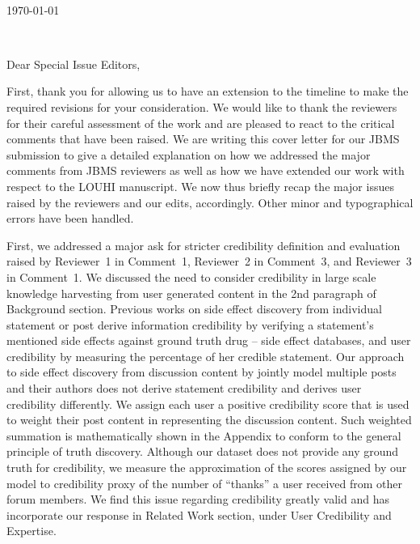 \documentclass[11pt,a4paper]{letter} %
\def\opening#1{\thispagestyle{empty}
{\centering\fromaddress \vspace{0.6in} \\ %
\hspace*{\longindentation}\today\hspace*{\fill}\par} %
{\raggedright \toname \\ \toaddress \par} %
\vspace{0.4in} %
\noindent #1 %
}
\begin{document}

\begin{letter}
{}
\small
\opening{Dear Special Issue Editors,}

First, thank you for allowing us to have an extension to the timeline to make the required revisions for your consideration.  We would like to thank the reviewers for their careful assessment of the work and are pleased to react to the critical comments that have been raised.  We are writing this cover letter for our JBMS submission to give a detailed explanation on how we addressed the major comments from JBMS reviewers as well as how we have extended our work with respect to the LOUHI manuscript. We now thus briefly recap the major issues raised by the reviewers and our edits, accordingly. Other minor and typographical errors have been handled.

First, we addressed a major ask for stricter credibility definition and evaluation raised by Reviewer~1 in Comment~1, Reviewer~2 in Comment~3, and Reviewer~3 in Comment~1. We discussed the need to consider credibility in large scale knowledge harvesting from user generated content in the 2nd paragraph of Background section. Previous works on side effect discovery from individual statement or post derive information credibility by verifying a statement's mentioned side effects against ground truth drug -- side effect databases, and user credibility by measuring the percentage of her credible statement. Our approach to side effect discovery from discussion content by jointly model multiple posts and their authors does not derive statement credibility and derives user credibility differently. We assign each user a positive credibility score that is used to weight their post content in representing the discussion content. Such weighted summation is mathematically shown in the Appendix to conform to the general principle of truth discovery. Although our dataset does not provide any ground truth for credibility, we measure the approximation of the scores assigned by our model to credibility proxy of the number of ``thanks'' a user received from other forum members. We find this issue regarding credibility greatly valid and has incorporate our response in Related Work section, under User Credibility and Expertise.


\end{letter}
\end{document}
